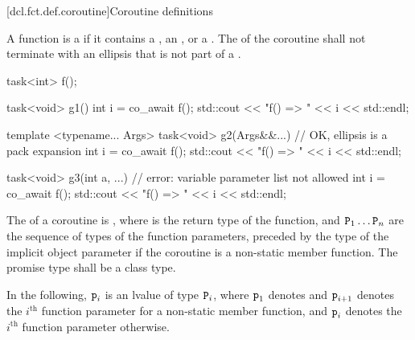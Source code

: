 [dcl.fct.def.coroutine]{Coroutine definitions}%
%

\pnum
A function is a  if it contains a
,
an ,
or a .
The  of the coroutine shall not
terminate with an ellipsis that is not part of
a .

\pnum
\begin{example}
\begin{codeblock}
task<int> f();

task<void> g1() {
  int i = co_await f();
  std::cout << "f() => " << i << std::endl;
}

template <typename... Args>
task<void> g2(Args&&...) {      // OK, ellipsis is a pack expansion
  int i = co_await f();
  std::cout << "f() => " << i << std::endl;
}

task<void> g3(int a, ...) {     // error: variable parameter list not allowed
  int i = co_await f();
  std::cout << "f() => " << i << std::endl;
}
\end{codeblock}
\end{example}

\pnum
{}%
The  of a coroutine is
,
where
 is the return type of the function, and
$\texttt{P}_1 \dotsc \texttt{P}_n$ are the sequence of types of the function parameters,
preceded by the type of the implicit object parameter
if the coroutine is a non-static member function.
The promise type shall be a class type.

\pnum
In the following, $\texttt{p}_i$ is an lvalue of type $\texttt{P}_i$,
where
$\texttt{p}_1$ denotes  and
$\texttt{p}_{i+1}$ denotes the $i^\textrm{th}$ function parameter
for a non-static member function, and
$\texttt{p}_i$ denotes
the $i^\textrm{th}$ function parameter otherwise.

